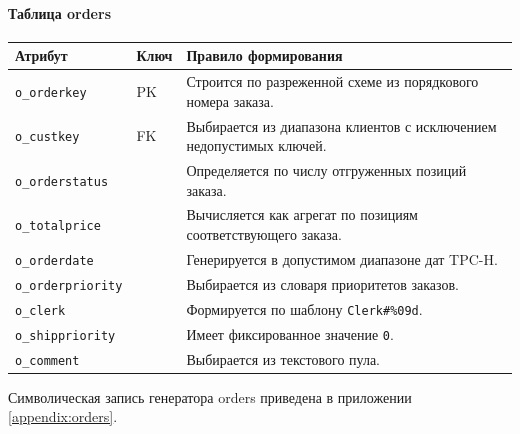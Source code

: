 \paragraph{Таблица orders}
\begin{center}
\small
\begin{tabular}{|p{}|p{}|p{}|}
\hline
\textbf{Атрибут} & \textbf{Ключ} & \textbf{Правило формирования} \\
\hline
\texttt{o\_orderkey} & PK & Строится по разреженной схеме из порядкового номера заказа. \\
\hline
\texttt{o\_custkey} & FK & Выбирается из диапазона клиентов с исключением недопустимых ключей. \\
\hline
\texttt{o\_orderstatus} &  & Определяется по числу отгруженных позиций заказа. \\
\hline
\texttt{o\_totalprice} &  & Вычисляется как агрегат по позициям соответствующего заказа. \\
\hline
\texttt{o\_orderdate} &  & Генерируется в допустимом диапазоне дат TPC-H. \\
\hline
\texttt{o\_orderpriority} &  & Выбирается из словаря приоритетов заказов. \\
\hline
\texttt{o\_clerk} &  & Формируется по шаблону \texttt{Clerk\#\%09d}. \\
\hline
\texttt{o\_shippriority} &  & Имеет фиксированное значение \texttt{0}. \\
\hline
\texttt{o\_comment} &  & Выбирается из текстового пула. \\
\hline
\end{tabular}
\end{center}

Символическая запись генератора orders приведена в приложении
\ref{appendix:orders}.

